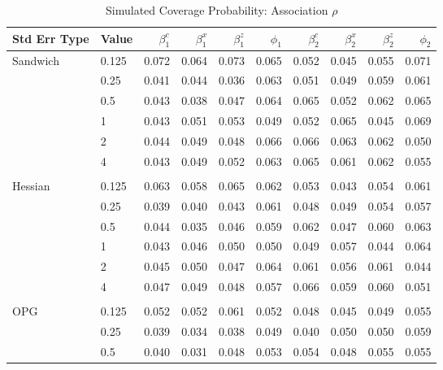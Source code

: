 \documentclass[12pt]{article}
\theoremstyle{definition}
\begin{document}
\begin{table}[b!] \centering
  \caption{Simulated Coverage Probability: Association $\rho$}
  \begin{threeparttable}
    {\footnotesize
    \begin{tabular}[r]{l l r r r r r r r r}
  \hline
Std Err Type & Value & $\beta_{1}^{c}$ & $\beta_{1}^{x}$ & $\beta_{1}^{z}$ & $\phi_{1}$ & $\beta_{2}^{c}$ & $\beta_{2}^{x}$ & $\beta_{2}^{z}$ & $\phi_{2}$ \\ 
  \hline

Sandwich  & 0.125 & 0.072 & 0.064 & 0.073 & 0.065 & 0.052 & 0.045 & 0.055 & 0.071 \\
          &  0.25 & 0.041 & 0.044 & 0.036 & 0.063 & 0.051 & 0.049 & 0.059 & 0.061 \\
          &   0.5 & 0.043 & 0.038 & 0.047 & 0.064 & 0.065 & 0.052 & 0.062 & 0.065 \\
          &     1 & 0.043 & 0.051 & 0.053 & 0.049 & 0.052 & 0.065 & 0.045 & 0.069 \\
          &     2 & 0.044 & 0.049 & 0.048 & 0.066 & 0.066 & 0.063 & 0.062 & 0.050 \\
          &     4 & 0.043 & 0.049 & 0.052 & 0.063 & 0.065 & 0.061 & 0.062 & 0.055 \\
          &       &       &       &       &       &       &       &       &       \\
Hessian   & 0.125 & 0.063 & 0.058 & 0.065 & 0.062 & 0.053 & 0.043 & 0.054 & 0.061 \\
          &  0.25 & 0.039 & 0.040 & 0.043 & 0.061 & 0.048 & 0.049 & 0.054 & 0.057 \\
          &   0.5 & 0.044 & 0.035 & 0.046 & 0.059 & 0.062 & 0.047 & 0.060 & 0.063 \\
          &     1 & 0.043 & 0.046 & 0.050 & 0.050 & 0.049 & 0.057 & 0.044 & 0.064 \\
          &     2 & 0.045 & 0.050 & 0.047 & 0.064 & 0.061 & 0.056 & 0.061 & 0.044 \\
          &     4 & 0.047 & 0.049 & 0.048 & 0.057 & 0.066 & 0.059 & 0.060 & 0.051 \\
          &       &       &       &       &       &       &       &       &       \\
OPG       & 0.125 & 0.052 & 0.052 & 0.061 & 0.052 & 0.048 & 0.045 & 0.049 & 0.055 \\
          &  0.25 & 0.039 & 0.034 & 0.038 & 0.049 & 0.040 & 0.050 & 0.050 & 0.059 \\
          &   0.5 & 0.040 & 0.031 & 0.048 & 0.053 & 0.054 & 0.048 & 0.055 & 0.055 \\

\end{tabular}}
\end{threeparttable}
\end{table}
\end{document}
